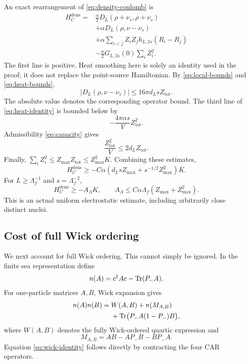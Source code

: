 An exact rearrangement of \eqref{eq:density-coulomb} is
\begin{align}
H_C^{\mathrm{dens}}={}&
\frac{\alpha}{2}D_L(\rho+\nu_s,\rho+\nu_s)
\nonumber\\
&+\alpha D_L(\rho,\nu-\nu_s)
\nonumber\\
&+\alpha\sum_{i<j}Z_iZ_jh_{L,2s}(R_i-R_j)
\nonumber\\
&-\frac{\alpha}{2}G_{L,2s}(0)\sum_iZ_i^2.
\label{eq:heat-identity}
\end{align}
The first line is positive. Heat smoothing here is solely an identity used
in the proof; it does not replace the point-source Hamiltonian.
By \eqref{eq:local-bounds} and \eqref{eq:heat-bounds},
\begin{equation}
\left|D_L(\rho,\nu-\nu_s)\right|
\le16\pi d_Ls Z_{\mathrm{tot}}.
\label{eq:cross-heat}
\end{equation}
The absolute value denotes the corresponding operator bound. The third
line of \eqref{eq:heat-identity} is bounded below by
\begin{equation}
-\frac{4\pi\alpha s}{V}Z_{\mathrm{tot}}^2.
\end{equation}
Admissibility \eqref{eq:capacity} gives
\begin{equation}
\frac{Z_{\mathrm{tot}}^2}{V}\le2d_LZ_{\mathrm{tot}}.
\end{equation}
Finally, \(\sum_iZ_i^2\le Z_{\max}Z_{\mathrm{tot}}\le Z_{\max}^2K\).
Combining these estimates,
\begin{equation}
H_C^{\mathrm{dens}}\ge
-C\alpha\left(d_LsZ_{\max}+s^{-1/2}Z_{\max}^2\right)K.
\end{equation}
For \(L\ge\Lambda_f^{-1}\) and \(s=\Lambda_f^{-2}\),
\begin{equation}
H_C^{\mathrm{dens}}\ge-A_\Lambda K,\qquad
A_\Lambda\le C\alpha\Lambda_f(Z_{\max}+Z_{\max}^2).
\label{eq:electrostatic-bound}
\end{equation}
This is an actual uniform electrostatic estimate, including arbitrarily
close distinct nuclei.

\subsection{Cost of full Wick ordering}
We next account for full Wick ordering. This cannot simply be ignored.
In the finite sea representation define
\begin{equation}
n(A)=c^\dagger Ac-\operatorname{Tr}(P_-A).
\end{equation}
For one-particle matrices \(A,B\), Wick expansion gives
\begin{equation}
\begin{split}
n(A)n(B)={}&W(A,B)+n(M_{A,B})\\
&+\operatorname{Tr}\bigl(P_-A(1-P_-)B\bigr),
\end{split}
\label{eq:wick-identity}
\end{equation}
where \(W(A,B)\) denotes the fully Wick-ordered quartic expression and
\begin{equation}
M_{A,B}=AB-AP_-B-BP_-A.
\end{equation}
Equation \eqref{eq:wick-identity} follows directly by contracting the four
CAR operators.

